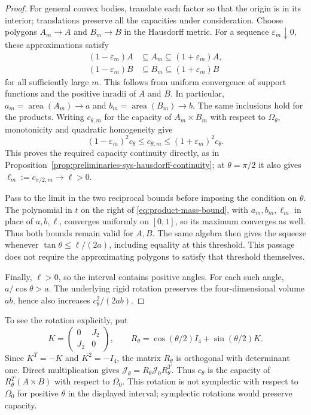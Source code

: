 \begin{proof}
For general convex bodies, translate each factor so that the origin is in
its interior; translations preserve all the capacities under consideration.
Choose polygons $A_m\to A$ and $B_m\to B$ in the Hausdorff metric.
For a sequence $\varepsilon_m\downarrow0$, these approximations satisfy
\[
 \begin{aligned}
 (1-\varepsilon_m)A&\subseteq A_m\subseteq(1+\varepsilon_m)A,\\
 (1-\varepsilon_m)B&\subseteq B_m\subseteq(1+\varepsilon_m)B
 \end{aligned}
\]
for all sufficiently large $m$. This follows from uniform convergence of
support functions and the positive inradii of $A$ and $B$. In particular,
$a_m=\operatorname{area}(A_m)\to a$ and
$b_m=\operatorname{area}(B_m)\to b$. The same inclusions hold for the
products. Writing $c_{\theta,m}$ for the capacity of $A_m\times B_m$
with respect to $\Omega_\theta$, monotonicity and quadratic homogeneity give
\[
 (1-\varepsilon_m)^2c_\theta
 \le c_{\theta,m}
 \le(1+\varepsilon_m)^2c_\theta.
\]
This proves the required capacity continuity directly, as in
Proposition~\ref{prop:preliminaries-sys-hausdorff-continuity}; at
$\theta=\pi/2$ it also gives $\ell_m:=c_{\pi/2,m}\to\ell>0$.

Pass to the limit in the two reciprocal bounds before imposing the
condition on $\theta$. The polynomial in $t$ on the right of
\eqref{eq:product-mass-bound}, with $a_m,b_m,\ell_m$ in place of
$a,b,\ell$, converges uniformly on $[0,1]$, so its maximum converges as
well. Thus both bounds remain valid for $A,B$. The same algebra then
gives the squeeze whenever $\tan\theta\le\ell/(2a)$, including equality
at this threshold. This passage does not require the approximating
polygons to satisfy that threshold themselves.

Finally, $\ell>0$, so the interval contains positive angles. For each such
angle, $a/\cos\theta>a$. The underlying rigid rotation preserves the
four-dimensional volume $ab$, hence also increases $c_\theta^2/(2ab)$.
\end{proof}

To see the rotation explicitly, put
\[
 K=\begin{pmatrix}0&J_2\\J_2&0\end{pmatrix},\qquad
 R_\theta=\cos(\theta/2)I_4+\sin(\theta/2)K.
\]
Since $K^T=-K$ and $K^2=-I_4$, the matrix $R_\theta$ is orthogonal with
determinant one. Direct multiplication gives
$\mathcal J_\theta=R_\theta \mathcal J_0R_\theta^T$. Thus $c_\theta$ is the capacity of
$R_\theta^T(A\times B)$ with respect to $\Omega_0$. This rotation is not
symplectic with respect to $\Omega_0$ for positive $\theta$ in the displayed
interval; symplectic rotations would preserve capacity.

